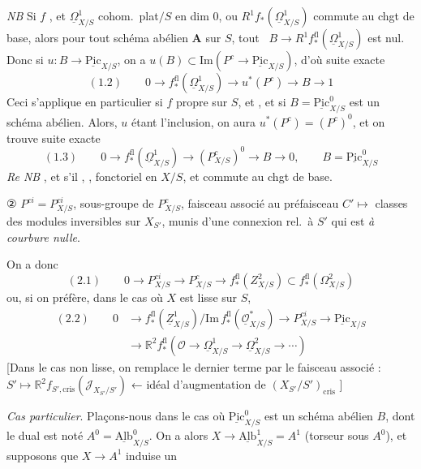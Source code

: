 \documentclass[11pt,a4paper]{article}
\begin{document}
\emph{NB} Si $f$  , et $\underline{\Omega}^{1}_{X/S}$ cohom.\ plat$/S$ en dim 0, ou $R^{1}f_{*}(\underline{\Omega}^{1}_{X/S})$ commute au chgt de base, alors pour tout schéma abélien $\mathbf{A}$ sur $S$, tout \ $B \to R^{1}f^{\mathrm{fl}}_{*}(\underline{\Omega}^{1}_{X/S})$ est nul. Donc si \ill{} \ill{} $u : B \to \underline{\mathrm{Pic}}_{X/S}$, on a $u(B) \subset \mathrm{Im}(P^{c} \to \underline{\mathrm{Pic}}_{X/S})$, d'où suite exacte
\[
(1.2) \qquad 0 \to f^{\mathrm{fl}}_{*}(\underline{\Omega}^{1}_{X/S}) \to u^{*}(P^{c}) \to B \to 1
\]
Ceci s'applique en particulier si $f$ propre sur $S$, et \ill{} \ill{}, et si $B = \underline{\mathrm{Pic}}^{0}_{X/S}$ est un schéma abélien. Alors, $u$ étant l'inclusion, on aura $u^{*}(P^{c}) = (P^{c})^{0}$, et on trouve suite exacte
\[
(1.3) \qquad 0 \to f^{\mathrm{fl}}_{*}(\underline{\Omega}^{1}_{X/S}) \to (P^{c}_{X/S})^{0} \to B \to 0, \qquad B = \underline{\mathrm{Pic}}^{0}_{X/S}
\]
\emph{Re NB} \ill{}, et s'il \ill{} , , \ill{} fonctoriel en $X/S$, et commute au chgt de base.

② $P^{ci} = P^{ci}_{X/S}$, sous-groupe de $P^{c}_{X/S}$, faisceau associé au préfaisceau $C' \mapsto$ classes des modules inversibles sur $X_{S'}$, munis d'une connexion rel.\ à $S'$ qui est \emph{à courbure nulle}.

On a donc
\[
(2.1) \qquad 0 \to P^{ci}_{X/S} \to P^{c}_{X/S} \to f^{\mathrm{fl}}_{*}(Z^{2}_{X/S}) \subset f^{\mathrm{fl}}_{*}(\Omega^{2}_{X/S})
\]
ou, si on préfère, dans le cas où $X$ est lisse sur $S$,
\[
\begin{aligned}
(2.2) \qquad 0 &\to f^{\mathrm{fl}}_{*}(\underline{Z}^{1}_{X/S})/\mathrm{Im}\, f^{\mathrm{fl}}_{*}(\underline{\mathcal{O}}^{*}_{X/S}) \to P^{ci}_{X/S} \to \underline{\mathrm{Pic}}_{X/S} \\
&\to \mathbb{R}^{2}f^{\mathrm{fl}}_{*}(\mathcal{O} \to \underline{\Omega}^{1}_{X/S} \to \underline{\Omega}^{2}_{X/S} \to \cdots)
\end{aligned}
\]
[Dans le cas non lisse, on remplace le dernier terme par \struck{\ill{}} le faisceau associé : $S' \mapsto \mathbb{R}^{2}f_{S',\mathrm{cris}}(\mathcal{J}_{X_{S'}/S'})$ ← idéal d'augmentation de $(X_{S'}/S')_{\mathrm{cris}}$ ]

\emph{Cas particulier}. Plaçons-nous dans le cas où $\underline{\mathrm{Pic}}^{0}_{X/S}$ est un schéma abélien $B$, dont le dual est noté $A^{0} = \underline{\mathrm{Alb}}^{0}_{X/S}$. On a alors $X \to \underline{\mathrm{Alb}}^{1}_{X/S} = A^{1}$ (torseur sous $A^{0}$), et supposons que $X \to A^{1}$ induise un 
\end{document}
